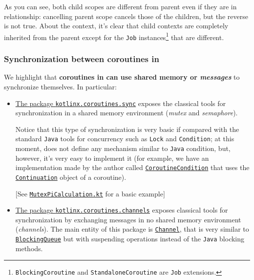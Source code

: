 As you can see, both child scopes are different from parent even if they are in relationship: cancelling parent scope cancels those of the children, but the reverse is not true.
About the context, it's clear that child contexts are completely inherited from the parent except for the \texttt{Job} instances\footnote{\texttt{BlockingCoroutine} and \texttt{StandaloneCoroutine} are \texttt{Job} extensions.} that are different.

\subsubsection{Synchronization between coroutines in \Kotlin}

We highlight that \textbf{coroutines in \Kotlin can use shared memory or \textit{messages}} to synchronize themselves. In particular:
\begin{itemize}
	\item \underline{The package \href{https://kotlinlang.org/api/kotlinx.coroutines/kotlinx-coroutines-core/kotlinx.coroutines.sync/}{\texttt{kotlinx.coroutines.sync}}} exposes the classical tools for synchronization in a shared memory environment (\textit{mutex} and \textit{semaphore}).
	
	Notice that this type of synchronization is very basic if compared with the standard \texttt{Java} tools for concurrency such as \texttt{Lock} and \texttt{Condition}; at this moment, \Kotlin does not define any mechanism similar to \texttt{Java} condition, but, however, it's very easy to implement it (for example, we have an implementation made by the author called \href{https://github.com/LM-96/KBomber/blob/main/kbomberx-concurrency/src/main/kotlin/kbomberx/concurrency/sync/CoroutineCondition.kt}{\texttt{CoroutineCondition}} that uses the \href{https://kotlinlang.org/api/latest/jvm/stdlib/kotlin.coroutines/-continuation/}{\texttt{Continuation}} object of a coroutine).
	
	$\big[$See \href{https://github.com/LM-96/Activity-Project-Operating-Systems-M-/blob/main/code/kotlin/unibo.apos.examples/src/main/kotlin/unibo/apos/examples/MutexPiCalculation.kt}{\texttt{MutexPiCalculation.kt}} for a basic example$\big]$
	
	\item \underline{The package \href{https://kotlinlang.org/api/kotlinx.coroutines/kotlinx-coroutines-core/kotlinx.coroutines.channels/}{\texttt{kotlinx.coroutines.channels}}} exposes classical tools for synchronization by exchanging messages in no shared memory environment (\textit{channels}).
	The main entity of this package is \href{https://kotlinlang.org/docs/channels.html}{\texttt{Channel}}, that is very similar to \href{https://docs.oracle.com/en/java/javase/18/docs/api/java.base/java/util/concurrent/BlockingQueue.html}{\texttt{BlockingQueue}} but with suspending operations instead of the \texttt{Java} blocking methods.
	

\end{itemize}
